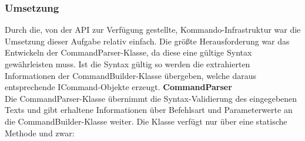 \subsubsection{Umsetzung}
Durch die, von der API zur Verfügung gestellte, Kommando-Infrastruktur war die Umsetzung dieser Aufgabe relativ einfach. Die größte Herausforderung war das Entwickeln der CommandParser-Klasse, da diese eine gültige Syntax gewährleisten muss. Ist die Syntax gültig so werden die extrahierten Informationen der CommandBuilder-Klasse übergeben, welche daraus entsprechende ICommand-Objekte erzeugt.
\textbf{CommandParser}\\
Die CommandParser-Klasse übernimmt die Syntax-Validierung des eingegebenen Texts und gibt erhaltene Informationen über Befehlsart und Parameterwerte an die CommandBuilder-Klasse weiter. Die Klasse verfügt nur über eine statische Methode und zwar:
